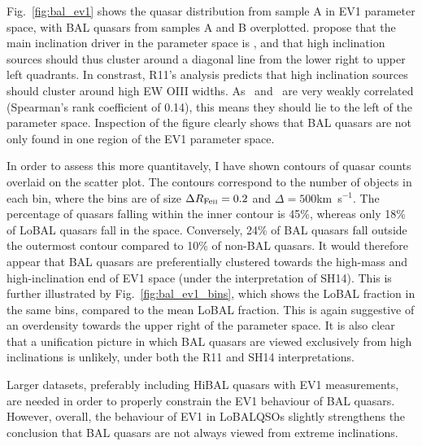 Fig.~\ref{fig:bal_ev1} shows the quasar distribution from sample A 
in EV1 parameter space, with BAL quasars from samples A and B overplotted.
\cite[][hereafter SH14]{shenho2014} propose 
that the main inclination driver in the parameter space
is \fwh, and that high inclination sources should thus cluster around
a diagonal line from the lower right to upper left quadrants. In constrast,
R11's analysis predicts that high inclination sources should cluster
around high EW OIII widths. As \ewo\ and \fwh\ are very weakly correlated
(Spearman's rank coefficient of 0.14), this means they should lie to
the left of the parameter space. Inspection of the figure clearly 
shows that BAL quasars are not only found in one region of the 
EV1 parameter space. 

In order to assess this more quantitavely, I have shown contours of 
quasar counts overlaid on the scatter plot. The contours correspond
to the number of objects in each bin, where the bins are of size
$\Delta R_{{\rm Fe \textsc{ii}}} = 0.2$ and $\Delta$\fwh$=500$km~s$^{-1}$.
The percentage of quasars falling within the inner contour is 45\%, 
whereas only 18\% of LoBAL quasars fall in the space. Conversely, 24\% 
of BAL quasars fall outside the outermost contour compared to 10\% of 
non-BAL quasars. It would therefore appear that BAL 
quasars are preferentially clustered towards the high-mass and 
high-inclination end of EV1 space (under the interpretation of SH14).
This is further illustrated by Fig.~\ref{fig:bal_ev1_bins},
which shows the LoBAL fraction in the same bins, compared to the 
mean LoBAL fraction. This is again suggestive of an overdensity 
towards the upper right of the parameter space.
It is also clear that a unification picture in which BAL 
quasars are viewed exclusively from high inclinations is unlikely,
under both the R11 and SH14 interpretations. 

Larger datasets, preferably including HiBAL quasars with EV1 measurements, 
are needed in order to properly constrain the EV1 behaviour of BAL quasars.
However, overall, the behaviour of EV1 in LoBALQSOs slightly 
strengthens the conclusion that BAL quasars are not always viewed from 
extreme inclinations.

